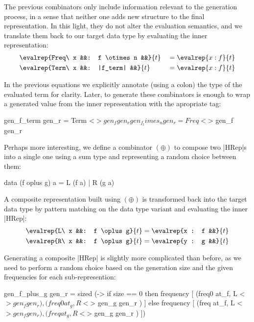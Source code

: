 The previous combinators only include information relevant to the generation
process, in a sense that neither one adds new structure to the final
representation.
%
In this light, they do not alter the evaluation semantics, and we translate them
back to our target data type by evaluating the inner representation:
%
\begin{alignat*}{4}
  &\evalrep{Freq\ x &&: f \otimes n &&}{t} &&= \evalrep{x : f}{t} \\
  &\evalrep{Term\ x &&: |f_term|    &&}{t} &&= \evalrep{x : f}{t}
\end{alignat*}

In the previous equations we explicitly annotate (using a colon) the type of the
evaluated term for clarity.
%
Later, to generate these combinators is enough to wrap a generated value from
the inner representation with the apropriate tag:

\begin{code}
gen_f_term     gen_r  = Term  <$> gen_f gen_r
gen_f_times_n  gen_r  = Freq  <$> gen_f gen_r
\end{code}


Perhaps more interesting, we define a combinator $(\oplus)$ to compose two
|HRep|s into a single one using a sum type and representing a random choice
between them:

\begin{code}
data (f oplus g) a = L (f a) | R (g a)
\end{code}

A composite representation built using $(\oplus)$ is transformed back into the
target data type by pattern matching on the data type variant and evaluating the
inner |HRep|:
%
\begin{alignat*}{3}
  &\evalrep{L\ x &&: f \oplus g}{t} = \evalrep{x : f &&}{t} \\
  &\evalrep{R\ x &&: f \oplus g}{t} = \evalrep{y : g &&}{t}
\end{alignat*}

Generating a composite |HRep| is slightly more complicated than before, as we
need to perform a random choice based on the generation size and the given
frequencies for each sub-represention:

\begin{code}
  gen_f_plus_g gen_r  = sized (\size ->
    if size == 0
    then frequency
      [ (freq0  at_f,  L  <$> gen_f  gen_r  )
      , (freq0  at_g,  R  <$> gen_g  gen_r  ) ]
    else frequency
      [ (freq   at_f,  L  <$> gen_f  gen_r  )
      , (freq   at_g,  R  <$> gen_g  gen_r  ) ])
\end{code} %

